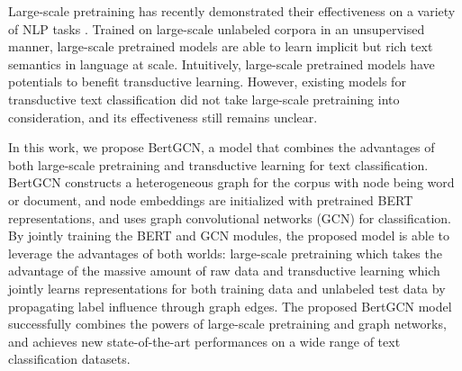 \documentclass[11pt,a4paper]{article}
\begin{document}
Large-scale pretraining has recently demonstrated their effectiveness on a variety of NLP tasks \citep{devlin2018bert, yinhan2019roberta}. 
Trained on large-scale unlabeled corpora in an unsupervised manner, 
large-scale pretrained models are able to learn  implicit but rich text semantics in language at scale. 
Intuitively, large-scale pretrained models have potentials to benefit transductive learning.
However, existing models for transductive text classification \citep{yao2019graph,liu2020tensor} did not take large-scale pretraining into consideration, and its effectiveness  still remains unclear.



In this work, we propose BertGCN, a model that combines the  advantages of both large-scale pretraining and transductive learning for text classification. BertGCN constructs a heterogeneous graph for the  corpus with node being word or document, and  node embeddings are initialized with pretrained BERT representations, and uses graph convolutional networks (GCN) for classification.
By jointly training the BERT and GCN modules,  the  proposed  model  is  able  to  leverage the advantages of both worlds: large-scale pretraining which takes the advantage of the massive amount of raw data and transductive learning which jointly learns representations for both training data and unlabeled test data by propagating label influence through graph edges.
The proposed BertGCN model successfully combines the powers of large-scale pretraining and graph networks, and achieves new state-of-the-art performances on a wide range of   text classification datasets.
\end{document}
